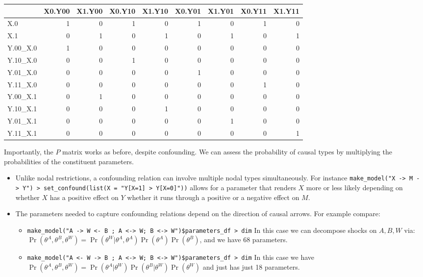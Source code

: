 \documentclass[
  11pt,
  article]{jss}
\providecommand{\tightlist}{%
  \setlength{\itemsep}{0pt}\setlength{\parskip}{0pt}}\usepackage{longtable,booktabs,array}
\begin{document}
\begin{tabular}{l|r|r|r|r|r|r|r|r}
\hline
  & X0.Y00 & X1.Y00 & X0.Y10 & X1.Y10 & X0.Y01 & X1.Y01 & X0.Y11 & X1.Y11\\
\hline
X.0 & 1 & 0 & 1 & 0 & 1 & 0 & 1 & 0\\
\hline
X.1 & 0 & 1 & 0 & 1 & 0 & 1 & 0 & 1\\
\hline
Y.00\_X.0 & 1 & 0 & 0 & 0 & 0 & 0 & 0 & 0\\
\hline
Y.10\_X.0 & 0 & 0 & 1 & 0 & 0 & 0 & 0 & 0\\
\hline
Y.01\_X.0 & 0 & 0 & 0 & 0 & 1 & 0 & 0 & 0\\
\hline
Y.11\_X.0 & 0 & 0 & 0 & 0 & 0 & 0 & 1 & 0\\
\hline
Y.00\_X.1 & 0 & 1 & 0 & 0 & 0 & 0 & 0 & 0\\
\hline
Y.10\_X.1 & 0 & 0 & 0 & 1 & 0 & 0 & 0 & 0\\
\hline
Y.01\_X.1 & 0 & 0 & 0 & 0 & 0 & 1 & 0 & 0\\
\hline
Y.11\_X.1 & 0 & 0 & 0 & 0 & 0 & 0 & 0 & 1\\
\hline
\end{tabular}

Importantly, the \(P\) matrix works as before, despite confounding. We
can assess the probability of causal types by multiplying the
probabilities of the constituent parameters.

\begin{itemize}
\tightlist
\item
  Unlike nodal restrictions, a confounding relation can involve multiple
  nodal types simultaneously. For instance
  \texttt{make\_model("X\ -\textgreater{}\ M\ -\textgreater{}\ Y")\ \textbar{}\textgreater{}\ set\_confound(list(X\ =\ "Y{[}X=1{]}\ \textgreater{}\ Y{[}X=0{]}"))}
  allows for a parameter that renders \(X\) more or less likely
  depending on whether \(X\) has a positive effect on \(Y\) whether it
  runs through a positive or a negative effect on \(M\).
\item
  The parameters needed to capture confounding relations depend on the
  direction of causal arrows. For example compare:

  \begin{itemize}
  \tightlist
  \item
    \texttt{make\_model("A\ -\textgreater{}\ W\ \textless{}-\ B\ ;\ A\ \textless{}-\textgreater{}\ W;\ B\ \textless{}-\textgreater{}\ W")\$parameters\_df\ \textbar{}\textgreater{}\ dim}
    In this case we can decompose shocks on \(A, B, W\) via:
    \(\Pr(\theta^A, \theta^B, \theta^W) = \Pr(\theta^W | \theta^A, \theta^A)\Pr(\theta^A)\Pr(\theta^B)\),
    and we have 68 parameters.
  \item
    \texttt{make\_model("A\ \textless{}-\ W\ -\textgreater{}\ B\ ;\ A\ \textless{}-\textgreater{}\ W;\ B\ \textless{}-\textgreater{}\ W")\$parameters\_df\ \textbar{}\textgreater{}\ dim}
    In this case we have
    \(\Pr(\theta^A, \theta^B, \theta^W) = \Pr(\theta^A | \theta^W)\Pr(\theta^B|\theta^W)\Pr(\theta^W)\)
    and just has just 18 parameters.
  \end{itemize}
\end{itemize}
\end{document}

